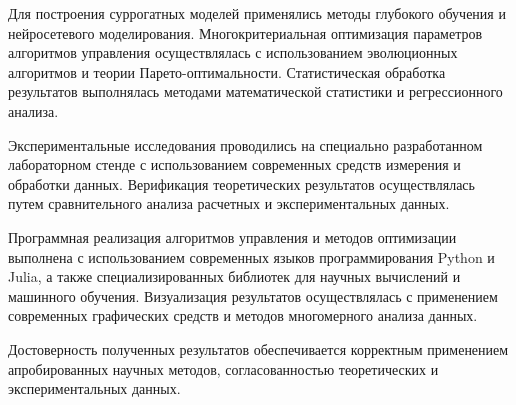 Для построения суррогатных моделей применялись методы глубокого обучения и нейросетевого
моделирования. Многокритериальная оптимизация параметров алгоритмов управления осуществлялась
с использованием эволюционных алгоритмов и теории Парето-оптимальности. Статистическая обработка
результатов выполнялась методами математической статистики и регрессионного анализа.

Экспериментальные исследования проводились на специально разработанном
лабораторном стенде с использованием современных средств измерения и
обработки данных. Верификация теоретических результатов осуществлялась
путем сравнительного анализа расчетных и экспериментальных данных.

Программная реализация алгоритмов управления и методов оптимизации
выполнена с использованием современных языков программирования Python и
Julia, а также специализированных библиотек для научных вычислений и машинного
обучения. Визуализация результатов осуществлялась с применением
современных графических средств и методов многомерного анализа данных.

Достоверность полученных результатов обеспечивается корректным применением
апробированных научных методов, согласованностью теоретических и экспериментальных
данных.

